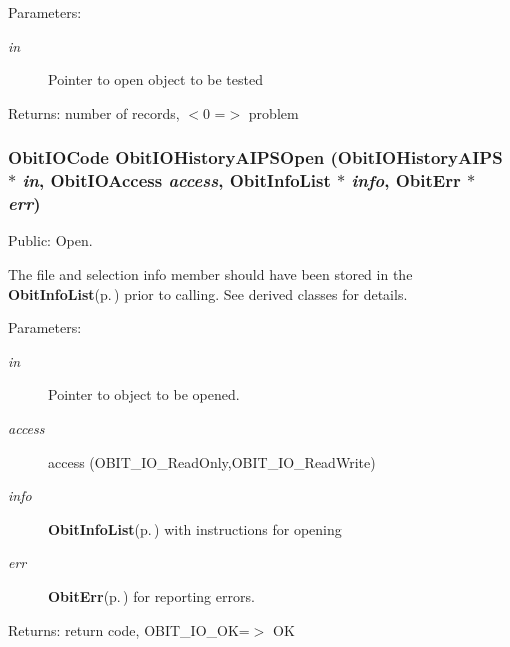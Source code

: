 \begin{Desc}
\item[Parameters:]
\begin{description}
\item[{\em in}]Pointer to open object to be tested \end{description}
\end{Desc}
\begin{Desc}
\item[Returns:]number of records, $<$0 =$>$ problem \end{Desc}
\subsubsection{\setlength{\rightskip}{0pt plus 5cm}Obit\-IOCode Obit\-IOHistory\-AIPSOpen ({\bf Obit\-IOHistory\-AIPS} $\ast$ {\em in}, Obit\-IOAccess {\em access}, {\bf Obit\-Info\-List} $\ast$ {\em info}, {\bf Obit\-Err} $\ast$ {\em err})}\label{ObitIOHistoryAIPS_8h_a11}


Public: Open. 

The file and selection info member should have been stored in the {\bf Obit\-Info\-List}{\rm (p.\,\pageref{structObitInfoList})} prior to calling. See derived classes for details. \begin{Desc}
\item[Parameters:]
\begin{description}
\item[{\em in}]Pointer to object to be opened. \item[{\em access}]access (OBIT\_\-IO\_\-Read\-Only,OBIT\_\-IO\_\-Read\-Write) \item[{\em info}]{\bf Obit\-Info\-List}{\rm (p.\,\pageref{structObitInfoList})} with instructions for opening \item[{\em err}]{\bf Obit\-Err}{\rm (p.\,\pageref{structObitErr})} for reporting errors. \end{description}
\end{Desc}
\begin{Desc}
\item[Returns:]return code, OBIT\_\-IO\_\-OK=$>$ OK \end{Desc}
